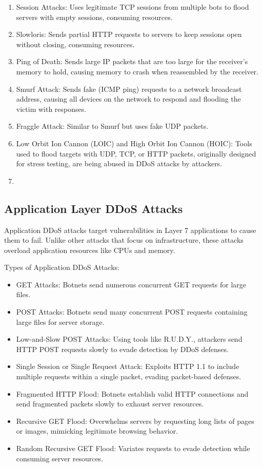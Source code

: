 \documentclass[a4paper, 12pt]{report} %
\begin{document}
\begin{table}[h!]
\begin{enumerate}
\begin{itemize}
            
        \end{itemize}
        \item Session Attacks: Uses legitimate TCP sessions from multiple bots to flood servers with empty sessions, consuming resources.
        \item Slowloris: Sends partial HTTP requests to servers to keep sessions open without closing, consuming resources.
        \item Ping of Death: Sends large IP packets that are too large for the receiver’s memory to hold, causing memory to crash when reassembled by the receiver.
        \item Smurf Attack: Sends fake (ICMP ping) requests to a network broadcast address, causing all devices on the network to respond and flooding the victim with responses.
        \item Fraggle Attack: Similar to Smurf but uses fake UDP packets.
        \item Low Orbit Ion Cannon (LOIC) and High Orbit Ion Cannon (HOIC): Tools used to flood targets with UDP, TCP, or HTTP packets, originally designed for stress testing, are being abused in DDoS attacks by attackers.
        \item 
        \end{enumerate}


        \subsection{Application Layer DDoS Attacks}
        Application DDoS attacks target vulnerabilities in Layer 7 applications to cause them to fail. Unlike other attacks that focus on infrastructure, these attacks overload application resources like CPUs and memory.

        Types of Application DDoS Attacks:
        
        \begin{itemize}
            \item GET Attacks: Botnets send numerous concurrent GET requests for large files.
            \item POST Attacks: Botnets send many concurrent POST requests containing large files for server storage.
            \item Low-and-Slow POST Attacks: Using tools like R.U.D.Y., attackers send HTTP POST requests slowly to evade detection by DDoS defenses.
            \item Single Session or Single Request Attack: Exploits HTTP 1.1 to include multiple requests within a single packet, evading packet-based defenses.
            \item Fragmented HTTP Flood: Botnets establish valid HTTP connections and send fragmented packets slowly to exhaust server resources.
            \item Recursive GET Flood: Overwhelms servers by requesting long lists of pages or images, mimicking legitimate browsing behavior.
            \item Random Recursive GET Flood: Variates requests to evade detection while consuming server resources.
        \end{itemize}


\end{table}
\end{document}
